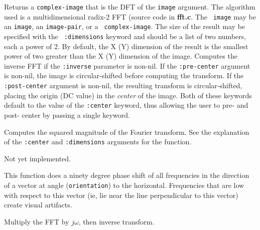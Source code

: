 \begin{description}
\item{} Returns a {\tt complex-image} that is the
DFT of the {\tt image} argument.  The algorithm used is a
multidimensional radix-2 FFT (source code in {\bf fft.c}.  The {\tt
image} may be an {\tt image}, an {\tt image-pair}, or a {\tt
complex-image}.  The size of the result may be specified with the {\tt
:dimensions} keyword and should be a list of two numbers, each a power
of 2.  By default, the X (Y) dimension of the result is the smallest
power of two greater than the X (Y) dimension of the image.  Computes
the inverse FFT if the {\tt :inverse} parameter is non-nil.  If the
{\tt :pre-center} argument is non-nil, the image is circular-shifted
before computing the transform.  If the {\tt :post-center} argument is
non-nil, the resulting transform is circular-shifted, placing the
origin (DC value) in the {\em center} of the image.  Both of these
keywords default to the value of the {\tt :center} keyword, thus
allowing the user to pre- and post- center by passing a single
keyword.

\item{}
Computes the squared magnitude of the Fourier transform.  See the
explanation of the {\tt :center} and {\tt :dimensions} arguments for
the  function.

\item{}
Not yet implemented.

\item{}
This function does a ninety degree phase shift of all frequencies in
the direction of a vector at angle ({\tt orientation}) to the
horizontal.  Frequencies that are low with respect to this vector (ie,
lie near the line perpendicular to this vector) create visual
artifacts.

\item{}
Multiply the FFT by $j\omega$, then inverse transform.
\end{description}



